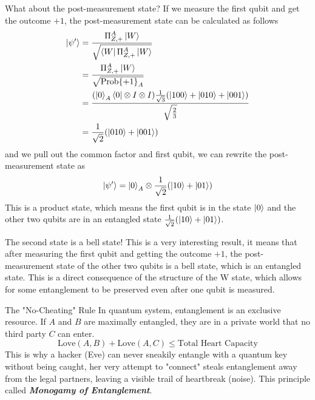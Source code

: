 \documentclass[11pt, letterpaper]{article}
\begin{document}
What about the post-measurement state? If we measure the first qubit and get the outcome $+1$, the post-measurement state can be calculated as follows
\begin{equation}
  \begin{aligned}
    \ket{\psi'} & = \frac{\Pi_{Z, +}^{A} \ket{W}}{\sqrt{\bra{W} \Pi_{Z, +}^{A} \ket{W}}} \\
    & = \frac{\Pi_{Z, +}^{A} \ket{W}}{\sqrt{\text{Prob\{+1\}}_A}} \\
    & = \frac{(\ket{0}_A\bra{0} \otimes I \otimes I) \frac{1}{\sqrt{3}}(\ket{100} + \ket{010} + \ket{001})}{\sqrt{\frac{2}{3}}} \\
    & = \frac{1}{\sqrt{2}}(\ket{010} + \ket{001})
  \end{aligned}
\end{equation}
and we pull out the common factor and first qubit, we can rewrite the post-measurement state as
\begin{equation}
  \ket{\psi'} = \ket{0}_A \otimes \frac{1}{\sqrt{2}}(\ket{10} + \ket{01})
\end{equation}
This is a product state, which means the first qubit is in the state $\ket{0}$ and the other two qubits are in an entangled state $\frac{1}{\sqrt{2}}(\ket{10} + \ket{01})$. 

The second state is a bell state! This is a very interesting result, it means that after measuring the first qubit and getting the outcome $+1$, the post-measurement state of the other two qubits is a bell state, which is an entangled state. This is a direct consequence of the structure of the W state, which allows for some entanglement to be preserved even after one qubit is measured.

\begin{SBUBox}{The "No-Cheating" Rule}
  In quantum system, entanglement is an exclusive resource. If $A$ and $B$ are maximally entangled, they are in a private world that no third party $C$ can enter.
  \begin{equation*}
  \text{Love}(A,B) + \text{Love}(A,C) \le \text{Total Heart Capacity}
  \end{equation*}
  This is why a hacker (Eve) can never sneakily entangle with a quantum key without being caught, her very attempt to "connect" steals entanglement away from the legal partners, leaving a visible trail of heartbreak (noise). This principle called \textbf{\textit{Monogamy of Entanglement}}.
\end{SBUBox}

\newpage
\end{document}
